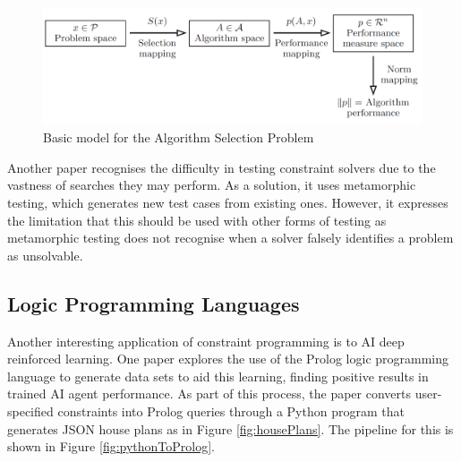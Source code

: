 \begin{figure}[H]
    \centering
    \includegraphics[width=\textwidth, height=0.3\textheight, keepaspectratio]{Images/AlgorithmSelection.png}
    \caption{Basic model for the Algorithm Selection Problem \cite{Data_Mining_and_Constraint_Programming}}
    \label{fig:algorithmSelection}
\end{figure}

Another paper \cite{Metamorphic_Testing} recognises the difficulty in testing constraint solvers due to the vastness of searches they may perform. As a solution, it uses metamorphic testing, which generates new test cases from existing ones. However, it expresses the limitation that this should be used with other forms of testing as metamorphic testing does not recognise when a solver falsely identifies a problem as unsolvable.

\subsection{Logic Programming Languages}
Another interesting application of constraint programming is to AI deep reinforced learning. One paper \cite{Prolog_Deep_Learning} explores the use of the Prolog logic programming language to generate data sets to aid this learning, finding positive results in trained AI agent performance. As part of this process, the paper converts user-specified constraints into Prolog queries through a Python program that generates JSON house plans as in Figure \ref{fig:housePlans}. The pipeline for this is shown in Figure \ref{fig:pythonToProlog}.


